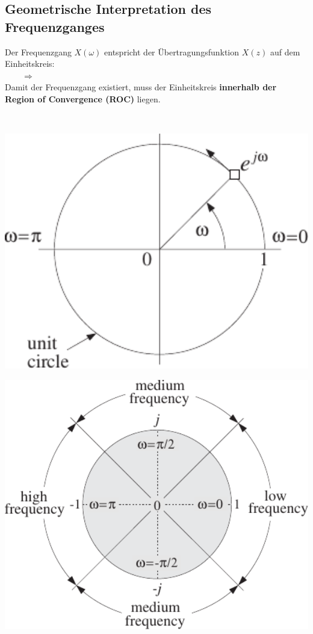 	\subsection{Geometrische Interpretation des Frequenzganges}
		\begin{minipage}{0.44\textwidth}
			Der Frequenzgang $X(\omega)$ entspricht der Übertragungsfunktion $X(z)$ auf dem Einheitskreis:\\[0.3cm]
			$\qquad\Rightarrow\qquad$\\[0.3cm]
			Damit der Frequenzgang existiert, muss der Einheitskreis \textbf{innerhalb der Region of Convergence (ROC)} liegen.
		\end{minipage}\begin{minipage}{0.03\textwidth}$ $\end{minipage}
		\begin{minipage}{0.27\textwidth}
			\includegraphics[width = 1\textwidth]{pic/geoFrequenzgang.pdf}\\
		\end{minipage}
		\begin{minipage}{0.26\textwidth}
			\includegraphics[width = 1\textwidth]{pic/frequency.pdf}
		\end{minipage}
